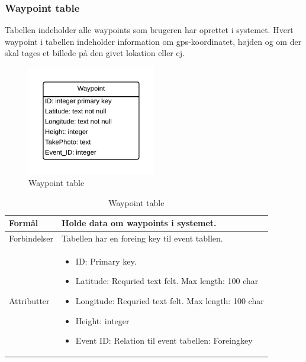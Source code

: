 \subsubsection*{Waypoint table}
Tabellen indeholder alle waypoints som brugeren har oprettet i systemet. Hvert waypoint i tabellen indeholder information om gps-koordinatet, højden og om der skal tages et billede på den givet lokation eller ej.
\vspace{-5pt}
\begin{figure}[H]
	\centering
	\includegraphics[width=0.5\textwidth]{Billeder/database/WaypointTable.png}
	\vspace{-5pt}
	\caption{Waypoint table}
	\label{fig:waypoint_table}
\end{figure}

\begin{table}[H]
\begin{tabular}{| p{3cm}| p{11.5cm}|}
\hline

Formål	 							& Holde data om waypoints i systemet.\\\hline
Forbindelser						& Tabellen har en foreing key til event tabllen.\\\hline
Attributter						& \begin{itemize}
												\item ID: Primary key.
												\item Latitude: Requried text felt. Max length: 100 char
												\item Longitude: Requried text felt. Max length: 100 char
												\item Height: integer
												\item Event ID: Relation til event tabellen: Foreingkey
											\end{itemize} \\\hline 
\end{tabular}
\caption{Waypoint table}
\label{tab:waypoint_table}
\end{table}